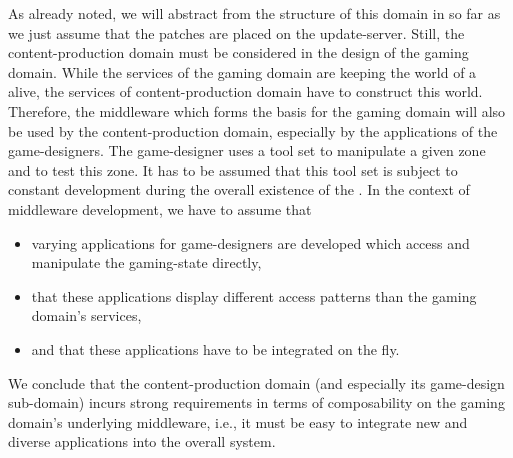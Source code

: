 \documentclass[a4paper, 10pt]{book}
\begin{document}
                As already noted, we will abstract from the structure of this domain
                in so far as we just assume that the patches are placed on the
                update-server. Still, the content-production domain must be considered
                in the design of the gaming domain. While the services of the gaming
                domain are keeping the world of a \MMORG alive, the services of
                content-production domain have to construct this world. Therefore, the
                middleware which forms the basis for the gaming domain will also be
                used by the content-production domain, especially by the applications
                of the game-designers. The game-designer uses a tool set to
                manipulate a given zone and to test this zone. It has to be assumed that
                this tool set is subject to constant development during the overall
                existence of the \MMORG. In the context of middleware development, we
                have to assume that
                \begin{itemize}
                    \item varying applications for game-designers are developed which
                        access and manipulate the gaming-state directly,
                    \item that these applications display different access patterns than
                        the gaming domain's services,
                    \item and that these applications have to be integrated on the fly.
                \end{itemize}
                We conclude that the content-production domain (and especially its
                game-design sub-domain) incurs strong requirements in terms of
                composability on the gaming domain's underlying middleware, i.e., it
                must be easy to integrate new and diverse applications into the
                overall system.
\end{document}
